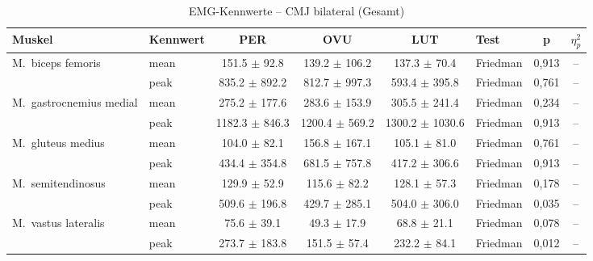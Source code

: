 
\begin{table}[H]
  \centering
  \caption{EMG-Kennwerte – CMJ bilateral (Gesamt)}
  \label{tab:CMJ_bilateral_Gesamt}
  \small
  \begin{tabular}{l l c c c l c c}
    \hline
    \textbf{Muskel} & \textbf{Kennwert} & \textbf{PER} & \textbf{OVU} & \textbf{LUT} & \textbf{Test} & \textbf{p} & \textbf{$\eta^2_p$} \\
    \hline
    M.~biceps femoris & mean & 151.5 $\pm$ 92.8 & 139.2 $\pm$ 106.2 & 137.3 $\pm$ 70.4 & Friedman & 0{,}913 & -- \\
     & peak & 835.2 $\pm$ 892.2 & 812.7 $\pm$ 997.3 & 593.4 $\pm$ 395.8 & Friedman & 0{,}761 & -- \\
    \hline
    M.~gastrocnemius medial & mean & 275.2 $\pm$ 177.6 & 283.6 $\pm$ 153.9 & 305.5 $\pm$ 241.4 & Friedman & 0{,}234 & -- \\
     & peak & 1182.3 $\pm$ 846.3 & 1200.4 $\pm$ 569.2 & 1300.2 $\pm$ 1030.6 & Friedman & 0{,}913 & -- \\
    \hline
    M.~gluteus medius & mean & 104.0 $\pm$ 82.1 & 156.8 $\pm$ 167.1 & 105.1 $\pm$ 81.0 & Friedman & 0{,}761 & -- \\
     & peak & 434.4 $\pm$ 354.8 & 681.5 $\pm$ 757.8 & 417.2 $\pm$ 306.6 & Friedman & 0{,}913 & -- \\
    \hline
    M.~semitendinosus & mean & 129.9 $\pm$ 52.9 & 115.6 $\pm$ 82.2 & 128.1 $\pm$ 57.3 & Friedman & 0{,}178 & -- \\
     & peak & 509.6 $\pm$ 196.8 & 429.7 $\pm$ 285.1 & 504.0 $\pm$ 306.0 & Friedman & 0{,}035 & -- \\
    \hline
    M.~vastus lateralis & mean & 75.6 $\pm$ 39.1 & 49.3 $\pm$ 17.9 & 68.8 $\pm$ 21.1 & Friedman & 0{,}078 & -- \\
     & peak & 273.7 $\pm$ 183.8 & 151.5 $\pm$ 57.4 & 232.2 $\pm$ 84.1 & Friedman & 0{,}012 & -- \\
    \hline
  \end{tabular}
\end{table}


